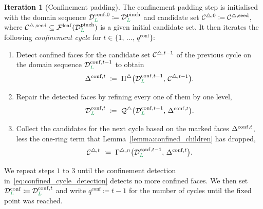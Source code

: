 \documentclass[a4paper, 12pt]{article}
\makeatletter
\newcommand{\quadriF}{\mathcal{Q}^{\triangle}}                   %
\newcommand{\collectF}{\Gamma^{\triangle}}                       %
\DeclareRobustCommand{\candF}[1][]{\mathcal{C}^{\triangle\ifx\@empty#1\@empty\else,#1\fi}}
\newcommand{\detectF}{\Pi^{\triangle}}                           %
\newcommand{\green}{\color{ForestGreen}}
\newcommand{\F}{\mathcal{F}}
\DeclareRobustCommand{\simplexsubsetTwo}[2][]{\Delta\ifx\@empty#1\@empty\else^{#1}\fi_{#2}}
\renewcommand{\L}{{\green L}}
\theoremstyle{definition}
\newtheorem{iteration}[theorem]{Iteration}
\theoremstyle{plain}
\numberwithin{equation}{section}
\DeclareRobustCommand{\domseq}[1][]{\mathcal{D}\ifx\@empty#1\@empty\else_{#1}\fi}
\newcommand{\leafMesh}{\F^{\mathrm{leaf}}}                  %
\makeatother
\begin{document}
\begin{iteration}[Confinement padding]
\label{it:confined_iteration}
    The confinement padding step is initialised with the domain sequence $\domseq[\L]^{\mathrm{conf},0} \coloneq \domseq[\L]^{\mathrm{pinch}}$ and candidate set $\candF[0] \coloneq \candF[\mathrm{seed}]$, where $\candF[\mathrm{seed}] \subseteq \leafMesh(\domseq[\L]^{\mathrm{pinch}})$ is a given initial candidate set. It then iterates the following \emph{confinement cycle} for $t \in \{1, \, \ldots, \, q^{\mathrm{conf}} \}$:
    \begin{enumerate}[topsep=3pt, itemsep=-2pt]
    \item Detect confined faces for the candidate set $\candF[t-1]$ of the previous cycle on the domain sequence $\domseq[\L]^{\mathrm{conf},t-1}$ to obtain
    \begin{equation}
        \label{eq:confined_cycle_detection}
        \simplexsubsetTwo[\mathrm{conf},t]{} \; \coloneq \; \detectF \big( \domseq[\L]^{\mathrm{conf},t-1}, \, \candF[t-1] \big) .
    \end{equation}
    \vspace{-7mm}
    \item Repair the detected faces by refining every one of them by one level,
    \begin{equation}
        \label{eq:confined_cycle_repair}
        \domseq[\L]^{\mathrm{conf},t} \; \coloneq \; \quadriF \big( \domseq[\L]^{\mathrm{conf},t-1}, \, \simplexsubsetTwo[\mathrm{conf},t]{} \big).
    \end{equation}
    \vspace{-7mm}
    \item Collect the candidates for the next cycle based on the marked faces $\simplexsubsetTwo[\mathrm{conf},t]{}$, less the one-ring term that Lemma~\ref{lemma:confined_children} has dropped,
    \begin{equation}
        \label{eq:confined_candidates}
        \candF[t] \; \coloneq \; \collectF{}^{,n} \big( \domseq[\L]^{\mathrm{conf},t-1}, \, \simplexsubsetTwo[\mathrm{conf},t]{} \big).
    \end{equation}
\end{enumerate}
We repeat steps $1$ to $3$ until the confinement detection in~\eqref{eq:confined_cycle_detection} detects no more confined faces. We then set $\domseq[\L]^{\mathrm{conf}} \coloneq \domseq[\L]^{\mathrm{conf},t}$ and write $q^{\mathrm{conf}} \coloneq t \! - \! 1$ for the number of cycles until the fixed point was reached.


\end{iteration}
\end{document}
